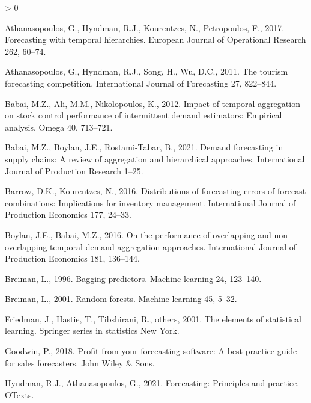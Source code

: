 \documentclass[]{elsarticle} %
\newlength{\cslhangindent}
\newenvironment{CSLReferences}[2] %
 {%
  \setlength{\parindent}{0pt}
  \ifodd #1 \everypar{\setlength{\hangindent}{\cslhangindent}}\ignorespaces\fi
  \ifnum #2 > 0
  \setlength{\parskip}{#2\baselineskip}
  \fi
 }%
 {}
\begin{document}
\hypertarget{refs}{}
\begin{CSLReferences}{1}{0}
\leavevmode\hypertarget{ref-athanasopoulos2017forecasting}{}%
Athanasopoulos, G., Hyndman, R.J., Kourentzes, N., Petropoulos, F.,
2017. Forecasting with temporal hierarchies. European Journal of
Operational Research 262, 60--74.

\leavevmode\hypertarget{ref-athanasopoulos2011tourism}{}%
Athanasopoulos, G., Hyndman, R.J., Song, H., Wu, D.C., 2011. The tourism
forecasting competition. International Journal of Forecasting 27,
822--844.

\leavevmode\hypertarget{ref-babai2012impact}{}%
Babai, M.Z., Ali, M.M., Nikolopoulos, K., 2012. Impact of temporal
aggregation on stock control performance of intermittent demand
estimators: Empirical analysis. Omega 40, 713--721.

\leavevmode\hypertarget{ref-babai2021demand}{}%
Babai, M.Z., Boylan, J.E., Rostami-Tabar, B., 2021. Demand forecasting
in supply chains: A review of aggregation and hierarchical approaches.
International Journal of Production Research 1--25.

\leavevmode\hypertarget{ref-barrow2016distributions}{}%
Barrow, D.K., Kourentzes, N., 2016. Distributions of forecasting errors
of forecast combinations: Implications for inventory management.
International Journal of Production Economics 177, 24--33.

\leavevmode\hypertarget{ref-boylan2016performance}{}%
Boylan, J.E., Babai, M.Z., 2016. On the performance of overlapping and
non-overlapping temporal demand aggregation approaches. International
Journal of Production Economics 181, 136--144.

\leavevmode\hypertarget{ref-breiman1996bagging}{}%
Breiman, L., 1996. Bagging predictors. Machine learning 24, 123--140.

\leavevmode\hypertarget{ref-breiman2001random}{}%
Breiman, L., 2001. Random forests. Machine learning 45, 5--32.

\leavevmode\hypertarget{ref-friedman2001elements}{}%
Friedman, J., Hastie, T., Tibshirani, R., others, 2001. The elements of
statistical learning. Springer series in statistics New York.

\leavevmode\hypertarget{ref-goodwin2018profit}{}%
Goodwin, P., 2018. Profit from your forecasting software: A best
practice guide for sales forecasters. John Wiley \& Sons.

\leavevmode\hypertarget{ref-hyndman2021forecasting}{}%
Hyndman, R.J., Athanasopoulos, G., 2021. Forecasting: Principles and
practice. OTexts.


\end{CSLReferences}
\end{document}
